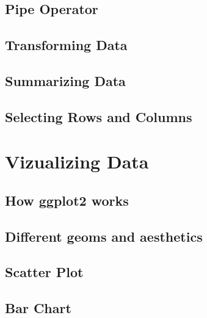 \documentclass[
]{book}
\begin{document}
\hypertarget{pipe-operator}{%
\subsection{Pipe Operator}\label{pipe-operator}}

\hypertarget{transforming-data}{%
\subsection{Transforming Data}\label{transforming-data}}

\hypertarget{summarizing-data}{%
\subsection{Summarizing Data}\label{summarizing-data}}

\hypertarget{selecting-rows-and-columns}{%
\subsection{Selecting Rows and Columns}\label{selecting-rows-and-columns}}

\hypertarget{vizualizing-data}{%
\section{Vizualizing Data}\label{vizualizing-data}}

\hypertarget{how-ggplot2-works}{%
\subsection{How ggplot2 works}\label{how-ggplot2-works}}

\hypertarget{different-geoms-and-aesthetics}{%
\subsection{Different geoms and aesthetics}\label{different-geoms-and-aesthetics}}

\hypertarget{scatter-plot}{%
\subsection{Scatter Plot}\label{scatter-plot}}

\hypertarget{bar-chart}{%
\subsection{Bar Chart}\label{bar-chart}}
\end{document}
